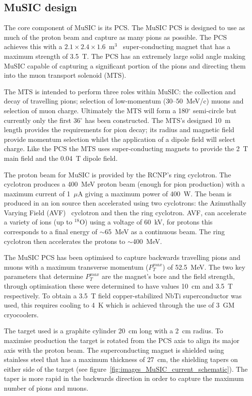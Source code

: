\subsection{MuSIC design} %
\label{sec:music_design}
The core component of MuSIC is its PCS. The MuSIC PCS is designed to use as much of the proton beam and capture as many pions as possible. The PCS achieves this with a \(2.1\times2.4\times1.6\)~m\(^3\)~\cite{music_cdr} super-conducting magnet that has a maximum strength of 3.5~T. The PCS has an extremely large solid angle making MuSIC capable of capturing a significant portion of the pions and directing them into the muon transport solenoid (MTS).

The MTS is intended to perform three roles within MuSIC: the collection and decay of travelling pions; selection of low-momentum (30--50~MeV/c) muons and selection of muon charge. Ultimately the MTS will form a 180\(^{\circ}\) semi-circle but currently only the first 36\(^{\circ}\) has been constructed. The MTS's designed 10~m length provides the requirements for pion decay; its radius and magnetic field provide momentum selection whilst the application of a dipole field will select charge. Like the PCS the MTS uses super-conducting magnets to provide the 2~T main field and the 0.04~T dipole field.

The proton beam for MuSIC is provided by the RCNP's ring cyclotron. The cyclotron produces a 400~MeV proton beam (enough for pion production) with a maximum current of 1~\(\mu\)A giving a maximum power of 400~W. The beam is produced in an ion source then accelerated using two cyclotrons: the Azimuthally Varying Field (AVF)~\cite{avf_facility} cyclotron and then the ring cyclotron. AVF, can accelerate a variety of ions (up to \(^{18}\)O) using a voltage of 60~kV, for protons this corresponds to a final energy of \(\sim\)65~MeV as a continuous beam. The ring cyclotron then accelerates the protons to \( \sim \)400~MeV. 

The MuSIC PCS has been optimised to capture backwards travelling pions and muons with a maximum transverse momentum (\(P_{T}^{max}\)) of 52.5~MeV. The two key parameters that determine \(P_{T}^{max}\) are the magnet's bore and the field strength, through optimisation these were determined to have values 10~cm and 3.5~T respectively. To obtain a 3.5~T field copper-stabilized NbTi superconductor was used, this requires cooling to 4~K which is achieved through the use of 3~GM cryocoolers. 

The target used is a graphite cylinder 20~cm long with a 2~cm radius. To maximise production the target is rotated from the PCS axis to align its major axis with the proton beam. The superconducting magnet is shielded using stainless steel that has a maximum thickness of 27~cm, the shielding tapers on either side of the target (see figure~\ref{fig:images_MuSIC_current_schematic}). The taper is more rapid in the backwards direction in order to capture the maximum number of pions and muons.  


